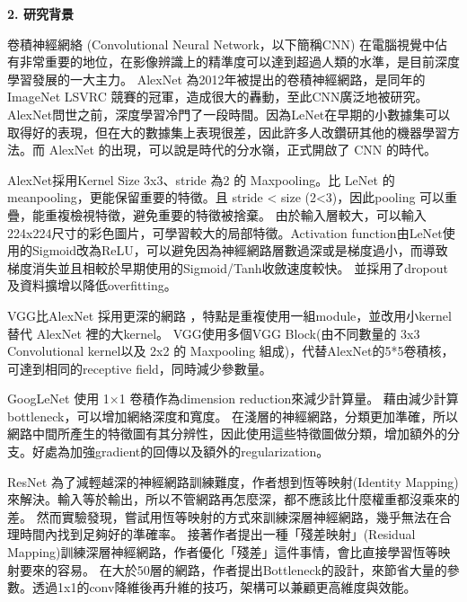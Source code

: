 \begin{flushleft}
  {\fontsize{12}{0} \bf 2. 研究背景}
  \setlength{\parskip}{10pt}

  \hspace*{2em}卷積神經網絡 (Convolutional Neural Network，以下簡稱CNN) 在電腦視覺中佔有非常重要的地位，在影像辨識上的精準度可以達到超過人類的水準，是目前深度學習發展的一大主力。
  AlexNet \cite{AlexNet} 為2012年被提出的卷積神經網路，是同年的ImageNet LSVRC 競賽的冠軍，造成很大的轟動，至此CNN廣泛地被研究。AlexNet問世之前，深度學習冷門了一段時間。因為LeNet在早期的小數據集可以取得好的表現，但在大的數據集上表現很差，因此許多人改鑽研其他的機器學習方法。而 AlexNet 的出現，可以說是時代的分水嶺，正式開啟了 CNN 的時代。
  
  \hspace*{2em}AlexNet\cite{AlexNet}採用Kernel Size 3x3、stride 為2 的 Maxpooling。比 LeNet 的meanpooling，更能保留重要的特徵。且 stride < size (2<3)，因此pooling 可以重疊，能重複檢視特徵，避免重要的特徵被捨棄。
  由於輸入層較大，可以輸入224x224尺寸的彩色圖片，可學習較大的局部特徵。Activation function由LeNet使用的Sigmoid改為ReLU，可以避免因為神經網路層數過深或是梯度過小，而導致梯度消失並且相較於早期使用的Sigmoid/Tanh收斂速度較快。
  並採用了dropout及資料擴增以降低overfitting。
  
  \hspace*{2em}VGG\cite{vgg}比AlexNet 採用更深的網路 ，特點是重複使用一組module，並改用小kernel替代 AlexNet 裡的大kernel。
  VGG使用多個VGG Block(由不同數量的 3x3 Convolutional kernel以及 2x2 的 Maxpooling 組成)，代替AlexNet的5*5卷積核，可達到相同的receptive field，同時減少參數量。

  \hspace{2em}GoogLeNet \cite{GoogLeNet}使用 1×1 卷積作為dimension reduction來減少計算量。 藉由減少計算bottleneck，可以增加網絡深度和寬度。
  在淺層的神經網路，分類更加準確，所以網路中間所產生的特徵圖有其分辨性，因此使用這些特徵圖做分類，增加額外的分支。好處為加強gradient的回傳以及額外的regularization。
  
  \hspace{2em}ResNet \cite{ResNet}為了減輕越深的神經網路訓練難度，作者想到恆等映射(Identity Mapping)來解決。輸入等於輸出，所以不管網路再怎麼深，都不應該比什麼權重都沒乘來的差。
  然而實驗發現，嘗試用恆等映射的方式來訓練深層神經網路，幾乎無法在合理時間內找到足夠好的準確率。
  接著作者提出一種「殘差映射」(Residual Mapping)訓練深層神經網路，作者優化「殘差」這件事情，會比直接學習恆等映射要來的容易。
  在大於50層的網路，作者提出Bottleneck的設計，來節省大量的參數。透過1x1的conv降維後再升維的技巧，架構可以兼顧更高維度與效能。
  

\end{flushleft}
